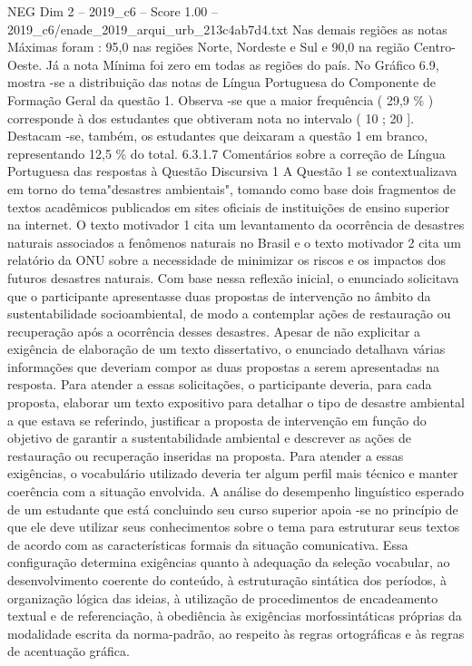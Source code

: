 \begin{textsample}{NEG Dim 2 – 2019\_c6 – Score 1.00 – 2019\_c6/enade\_2019\_arqui\_urb\_213c4ab7d4.txt}
Nas demais regiões as notas Máximas foram : 95,0 nas regiões Norte, Nordeste e Sul e 90,0 na região Centro-Oeste.
Já a nota Mínima foi zero em todas as regiões do país.
No Gráfico 6.9, mostra -se a distribuição das notas de Língua Portuguesa do Componente de Formação Geral da questão 1.
Observa -se que a maior frequência ( 29,9 \% ) corresponde à dos estudantes que obtiveram nota no intervalo ( 10 ; 20 ].
Destacam -se, também, os estudantes que deixaram a questão 1 em branco, representando 12,5 \% do total. 6.3.1.7 Comentários sobre a correção de Língua Portuguesa das respostas à Questão Discursiva 1 A Questão 1 se contextualizava em torno do tema"desastres ambientais", tomando como base dois fragmentos de textos acadêmicos publicados em sites oficiais de instituições de ensino superior na internet.
O texto motivador 1 cita um levantamento da ocorrência de desastres naturais associados a fenômenos naturais no Brasil e o texto motivador 2 cita um relatório da ONU sobre a necessidade de minimizar os riscos e os impactos dos futuros desastres naturais.
Com base nessa reflexão inicial, o enunciado solicitava que o participante apresentasse duas propostas de intervenção no âmbito da sustentabilidade socioambiental, de modo a contemplar ações de restauração ou recuperação após a ocorrência desses desastres.
Apesar de não explicitar a exigência de elaboração de um texto dissertativo, o enunciado detalhava várias informações que deveriam compor as duas propostas a serem apresentadas na resposta.
Para atender a essas solicitações, o participante deveria, para cada proposta, elaborar um texto expositivo para detalhar o tipo de desastre ambiental a que estava se referindo, justificar a proposta de intervenção em função do objetivo de garantir a sustentabilidade ambiental e descrever as ações de restauração ou recuperação inseridas na proposta.
Para atender a essas exigências, o vocabulário utilizado deveria ter algum perfil mais técnico e manter coerência com a situação envolvida.
A análise do desempenho linguístico esperado de um estudante que está concluindo seu curso superior apoia -se no princípio de que ele deve utilizar seus conhecimentos sobre o tema para estruturar seus textos de acordo com as características formais da situação comunicativa.
Essa configuração determina exigências quanto à adequação da seleção vocabular, ao desenvolvimento coerente do conteúdo, à estruturação sintática dos períodos, à organização lógica das ideias, à utilização de procedimentos de encadeamento textual e de referenciação, à obediência às exigências morfossintáticas próprias da modalidade escrita da norma-padrão, ao respeito às regras ortográficas e às regras de acentuação gráfica.

\end{textsample}
